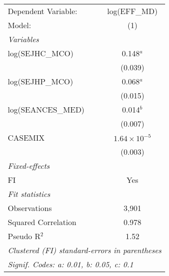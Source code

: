 
\begingroup
\centering
\begin{tabular}{lc}
   \tabularnewline \midrule \midrule
   Dependent Variable: & log(EFF\_MD)\\   
   Model:              & (1)\\  
   \midrule
   \emph{Variables}\\
   log(SEJHC\_MCO)     & 0.148$^{a}$\\   
                       & (0.039)\\   
   log(SEJHP\_MCO)     & 0.068$^{a}$\\   
                       & (0.015)\\   
   log(SEANCES\_MED)   & 0.014$^{b}$\\   
                       & (0.007)\\   
   CASEMIX             & $1.64\times 10^{-5}$\\    
                       & (0.003)\\   
   \midrule
   \emph{Fixed-effects}\\
   FI                  & Yes\\  
   \midrule
   \emph{Fit statistics}\\
   Observations        & 3,901\\  
   Squared Correlation & 0.978\\  
   Pseudo R$^2$        & 1.52\\  
   \midrule \midrule
   \multicolumn{2}{l}{\emph{Clustered (FI) standard-errors in parentheses}}\\
   \multicolumn{2}{l}{\emph{Signif. Codes: a: 0.01, b: 0.05, c: 0.1}}\\
\end{tabular}
\par\endgroup


